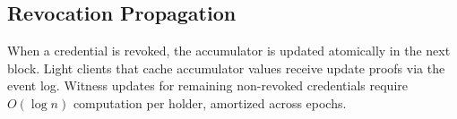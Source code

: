 \subsection{Revocation Propagation}

When a credential is revoked, the accumulator is updated atomically in the next block. Light clients that cache accumulator values receive update proofs via the \IdentityVM{} event log. Witness updates for remaining non-revoked credentials require $O(\log n)$ computation per holder, amortized across epochs.


